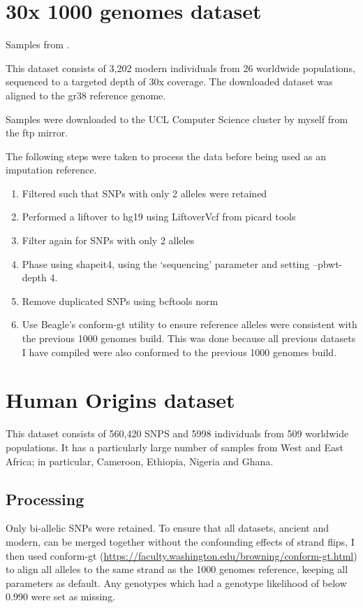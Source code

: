 \section{30x 1000 genomes dataset} \label{1000genomesdataset}

Samples from \cite{byrska2021high}.

This dataset consists of 3,202 modern individuals from 26 worldwide populations, sequenced to a targeted depth of 30x coverage. The downloaded dataset was aligned to the gr38 reference genome.

Samples were downloaded to the UCL Computer Science cluster by myself from the ftp mirror.

The following steps were taken to process the data before being used as an imputation reference. 

\begin{enumerate}
\item Filtered such that SNPs with only 2 alleles were retained
\item Performed a liftover to hg19 using LiftoverVcf from picard tools \cite{Picard2018toolkit}
\item Filter again for SNPs with only 2 alleles
\item Phase using shapeit4, using the `sequencing' parameter and setting --pbwt-depth 4.
\item Remove duplicated SNPs using bcftools norm \cite{li2009sequence} 
\item Use Beagle's conform-gt utility to ensure reference alleles were consistent with the previous 1000 genomes build. This was done because all previous datasets I have compiled were also conformed to the previous 1000 genomes build. 
\end{enumerate}

\section{Human Origins dataset} \label{HumanOriginsAppendix}

This dataset consists of 560,420 SNPS and 5998 individuals from 509 worldwide populations. It has a particularly large number of samples from West and East Africa; in particular, Cameroon, Ethiopia, Nigeria and Ghana. 

\subsection{Processing}

Only bi-allelic SNPs were retained. To ensure that all datasets, ancient and modern, can be merged together without the confounding effects of strand flips, I then used conform-gt (\url{https://faculty.washington.edu/browning/conform-gt.html}) to align all alleles to the same strand as the 1000 genomes reference, keeping all parameters as default. Any genotypes which had a genotype likelihood of below 0.990 were set as missing.

